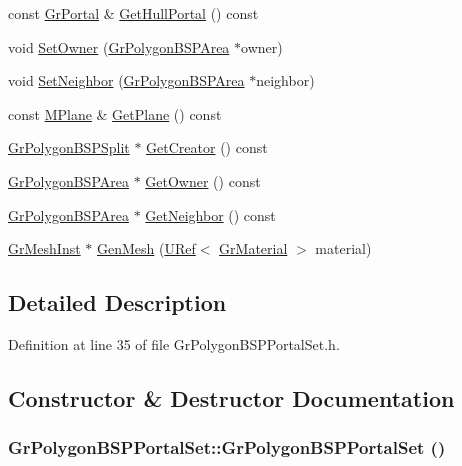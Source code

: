 \begin{CompactItemize}
\item 
const \hyperlink{class_gr_portal}{GrPortal} \& \hyperlink{class_gr_polygon_b_s_p_portal_set_b93adfe1f6c1cd860044c8531a933d99}{GetHullPortal} () const 
\item 
void \hyperlink{class_gr_polygon_b_s_p_portal_set_bf746cf2cfeaf5b44a803625986ba073}{SetOwner} (\hyperlink{class_gr_polygon_b_s_p_area}{GrPolygonBSPArea} $\ast$owner)
\item 
void \hyperlink{class_gr_polygon_b_s_p_portal_set_d095e8a7483db5cbe0fc518b234bf964}{SetNeighbor} (\hyperlink{class_gr_polygon_b_s_p_area}{GrPolygonBSPArea} $\ast$neighbor)
\item 
const \hyperlink{class_m_plane}{MPlane} \& \hyperlink{class_gr_polygon_b_s_p_portal_set_c58d0feb66fa4c5d875df0d25e7ad352}{GetPlane} () const 
\item 
\hyperlink{class_gr_polygon_b_s_p_split}{GrPolygonBSPSplit} $\ast$ \hyperlink{class_gr_polygon_b_s_p_portal_set_c4ae6e28d3a43e9dea180ba4c1b05f47}{GetCreator} () const 
\item 
\hyperlink{class_gr_polygon_b_s_p_area}{GrPolygonBSPArea} $\ast$ \hyperlink{class_gr_polygon_b_s_p_portal_set_84098f84d7dbf0ec066aaa6ad30aa1e1}{GetOwner} () const 
\item 
\hyperlink{class_gr_polygon_b_s_p_area}{GrPolygonBSPArea} $\ast$ \hyperlink{class_gr_polygon_b_s_p_portal_set_1828ab2d1236459003e49503672f4b6c}{GetNeighbor} () const 
\item 
\hyperlink{class_gr_mesh_inst}{GrMeshInst} $\ast$ \hyperlink{class_gr_polygon_b_s_p_portal_set_bb6f1689a2f57169d9e5a41d2e664bc1}{GenMesh} (\hyperlink{class_u_ref}{URef}$<$ \hyperlink{class_gr_material}{GrMaterial} $>$ material)
\end{CompactItemize}


\subsection{Detailed Description}


Definition at line 35 of file GrPolygonBSPPortalSet.h.

\subsection{Constructor \& Destructor Documentation}
\hypertarget{class_gr_polygon_b_s_p_portal_set_8c999dbeada3a6fd085881a5cd9a6fac}{
\subsubsection[{GrPolygonBSPPortalSet}]{\setlength{\rightskip}{0pt plus 5cm}GrPolygonBSPPortalSet::GrPolygonBSPPortalSet ()}}
\label{class_gr_polygon_b_s_p_portal_set_8c999dbeada3a6fd085881a5cd9a6fac}




